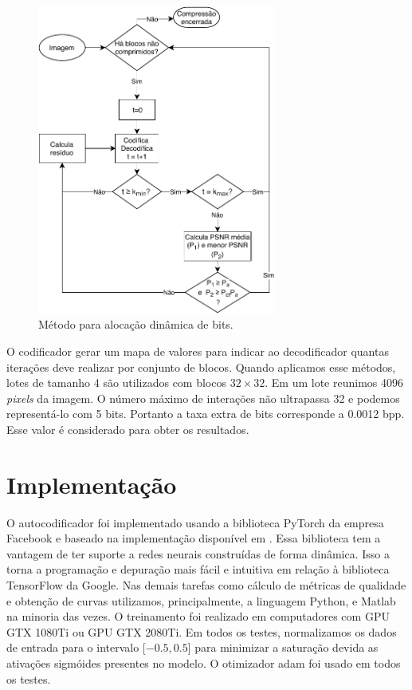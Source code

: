 \begin{figure}
\centering
\includegraphics[width=0.7\textwidth]{figuras/fluxograma.pdf}
\caption[Método para alocação dinâmica de bit]{Método para alocação dinâmica de bits.}
\label{fig:flux_vr}
\end{figure}		

O codificador gerar um mapa de valores para indicar ao decodificador quantas iterações deve realizar por conjunto de blocos. Quando aplicamos esse métodos, lotes de tamanho 4 são utilizados com blocos $32 \times 32$. Em um lote reunimos 4096 \textit{pixels} da imagem.
O número máximo de interações não ultrapassa 32 e podemos representá-lo com 5 bits. Portanto a taxa extra de bits corresponde a 0.0012 bpp. Esse valor é considerado para obter os resultados.    

\section{Implementação}

O autocodificador foi implementado usando a biblioteca PyTorch da empresa Facebook e baseado na implementação disponível em \cite{implementationRNNPytorch}. Essa biblioteca tem a vantagem de ter suporte a redes neurais construídas de forma dinâmica. Isso a torna a programação e depuração mais fácil e intuitiva em relação à biblioteca TensorFlow da Google. 
Nas demais tarefas como cálculo de métricas de qualidade e obtenção de curvas utilizamos, principalmente, a linguagem Python, e Matlab na minoria das vezes. O treinamento foi realizado em computadores com  GPU GTX 1080Ti ou GPU GTX 2080Ti. 
Em todos os testes, normalizamos os dados de entrada para o intervalo [$-0.5,0.5$] para minimizar a saturação devida as ativações sigmóides presentes no modelo. O otimizador \acrshort{adam} foi usado em todos os testes.   




